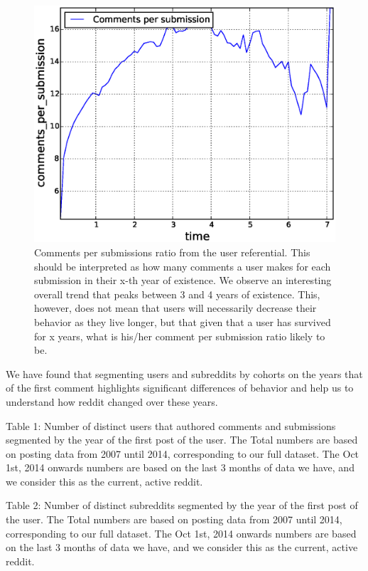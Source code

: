 \begin{figure}[!tb]
\centering
\includegraphics[scale=0.4]{./images/comments_per_submissions_user_ref_total.eps}
\caption{Comments per submissions ratio from the user referential. This should be interpreted as how many comments a user makes for each submission in their x-th year of existence. We observe an interesting overall trend that peaks between 3 and 4 years of existence. This, however, does not mean that users will necessarily decrease their behavior as they live longer, but that given that a user has survived for x years, what is his/her comment per submission ratio likely to be.}
\label{fig:comments_per_submissions_user_ref_total}
\end{figure}

We have found that segmenting users and subreddits by cohorts on the years that of the first comment highlights significant differences of behavior and help us to understand how reddit changed over these years.


Table 1: Number of distinct users that authored comments and submissions segmented by the year of the first post of the user. The Total numbers are based on posting data from 2007 until 2014, corresponding to our full dataset. The Oct 1st, 2014 onwards numbers are based on the last 3 months of data we have, and we consider this as the current, active reddit.


Table 2: Number of distinct subreddits segmented by the year of the first post of the user. The Total numbers are based on posting data from 2007 until 2014, corresponding to our full dataset. The Oct 1st, 2014 onwards numbers are based on the last 3 months of data we have, and we consider this as the current, active reddit.

